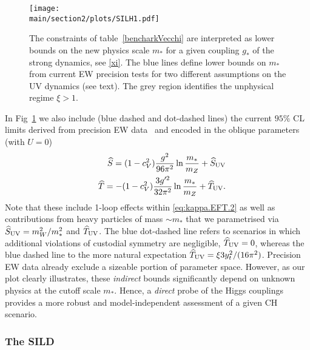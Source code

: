 \begin{figure}[t]
\begin{center}
\texttt{[image: \\main/section2/plots/SILH1.pdf]}
\caption{The constraints of table~\ref{bencharkVecchi} are interpreted as lower bounds on the new physics scale $m_*$ for a given coupling $g_*$ of the strong dynamics, see \eqref{xi}. The blue lines define lower bounds on $m_*$ from current EW precision tests for two different assumptions on the UV dynamics (see text). The grey region identifies the unphysical regime $\xi>1$. 
}\label{SILH}
\end{center}
\end{figure}



In Fig~\ref{SILH} we also include (blue dashed and dot-dashed lines) the current $95\%$ CL limits derived from precision EW data~\cite{Baak:2014ora} and encoded in the oblique parameters (with $U=0$)
\begin{eqnarray}
&&{\widehat S}=(1-c_V^2)\frac{g^2}{96\pi^2}\ln\frac{m_*}{m_Z}+{\widehat S}_{\rm UV}%
\\\nonumber
&&{\widehat T}=-(1-c_V^2)\frac{3g'^2}{32\pi^2}\ln\frac{m_*}{m_Z}+{\widehat T}_{\rm UV}.%
\end{eqnarray}
Note that these include 1-loop effects within \eqref{eq:kappa.EFT.2} as well as contributions from heavy particles of mass $\sim m_*$ that we parametrised via $\widehat S_{\rm UV}={m_W^2}/{m_*^2}$ and $\widehat T_{\rm UV}$. The blue dot-dashed line refers to scenarios in which additional violations of custodial symmetry are negligible, $\widehat T_{\rm UV}=0$, whereas the blue dashed line to the more natural expectation $\widehat T_{\rm UV}=\xi 3y_t^2/(16\pi^2)$. Precision EW data already exclude a sizeable portion of parameter space. However, as our plot clearly illustrates, these {\emph{indirect}} bounds significantly depend on unknown physics at the cutoff scale $m_*$. Hence, a {\emph{direct}} probe of the Higgs couplings provides a more robust and model-independent assessment of a given CH scenario.








\subsubsection*{The SILD}

